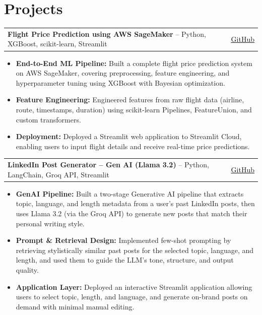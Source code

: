 \documentclass[letterpaper,8pt]{article}
\makeatletter
\newcommand{\resumeProject}[3]{
  \begin{tabular*}{\textwidth}{l @{\extracolsep{\fill}} r}
    \textbf{#1} \small{-- #2} & \small\href{#3}{\color{linkblue}\underline{GitHub}} \\
  \end{tabular*}
}
\makeatother
\begin{document}
\vspace{-15pt}

\section{Projects}

\resumeProject{Flight Price Prediction using AWS SageMaker}{Python, XGBoost, scikit-learn, Streamlit}{https://github.com/dipeshmaindolia001/sagemaker-flight-prices-prediction}
\begin{itemize}
    \item \textbf{End-to-End ML Pipeline:} Built a complete flight price prediction system on AWS SageMaker, covering preprocessing, feature engineering, and hyperparameter tuning using XGBoost with Bayesian optimization.
    \item \textbf{Feature Engineering:} Engineered features from raw flight data (airline, route, timestamps, duration) using scikit-learn Pipelines, FeatureUnion, and custom transformers.
    \item \textbf{Deployment:} Deployed a Streamlit web application to Streamlit Cloud, enabling users to input flight details and receive real-time price predictions.
\end{itemize}

\vspace{1pt}

\resumeProject{LinkedIn Post Generator -- Gen AI (Llama 3.2)}{Python, LangChain, Groq API, Streamlit}{https://github.com/dipeshmaindolia001/LinkedIn-Post-Generator-Gen-AI-Using-Llama3.2}
\begin{itemize}
    \item \textbf{GenAI Pipeline:} Built a two-stage Generative AI pipeline that extracts topic, language, and length metadata from a user's past LinkedIn posts, then uses Llama 3.2 (via the Groq API) to generate new posts that match their personal writing style.
    \item \textbf{Prompt \& Retrieval Design:} Implemented few-shot prompting by retrieving stylistically similar past posts for the selected topic, language, and length, and used them to guide the LLM's tone, structure, and output quality.
    \item \textbf{Application Layer:} Deployed an interactive Streamlit application allowing users to select topic, length, and language, and generate on-brand posts on demand with minimal manual editing.
\end{itemize}
\end{document}
